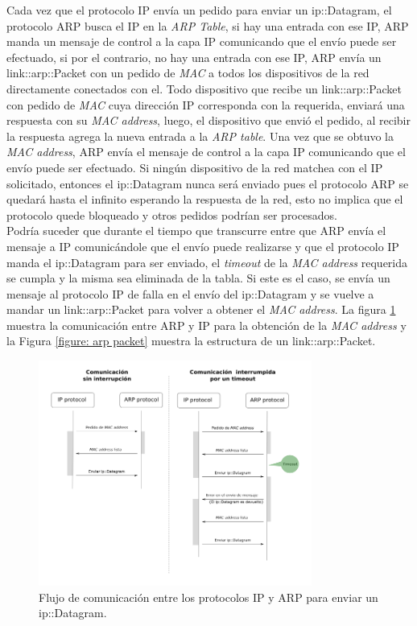 \documentclass[10pt,a4paper]{article}
\begin{document}
Cada vez que el protocolo IP envía un pedido para enviar un ip::Datagram, el protocolo ARP busca el IP en la \textit{ARP Table}, si hay una entrada con ese IP, ARP manda un mensaje de control a la capa IP comunicando que el envío puede ser efectuado, si por el contrario, no hay una entrada con ese IP, ARP envía un link::arp::Packet con un pedido de \textit{MAC} a todos los dispositivos de la red directamente conectados con el. Todo dispositivo que recibe un link::arp::Packet con pedido de \textit{MAC} cuya dirección IP corresponda con la requerida, enviará una respuesta con su \textit{MAC address}, luego, el dispositivo que envió el pedido, al recibir la respuesta agrega la nueva entrada a la \textit{ARP table}. Una vez que se obtuvo la \textit{MAC address}, ARP envía el mensaje de control a la capa IP comunicando que el envío puede ser efectuado. Si ningún dispositivo de la red matchea con el IP solicitado, entonces el ip::Datagram nunca será enviado pues el protocolo ARP se quedará hasta el infinito esperando la respuesta de la red, esto no implica que el protocolo quede bloqueado y otros pedidos podrían ser procesados.\\

Podría suceder que durante el tiempo que transcurre entre que ARP envía el mensaje a IP comunicándole que el envío puede realizarse y que el protocolo IP manda el ip::Datagram para ser enviado, el \textit{timeout} de la \textit{MAC address} requerida se cumpla y la misma sea eliminada de la tabla. Si este es el caso, se envía un mensaje al protocolo IP de falla en el envío del ip::Datagram y se vuelve a mandar un link::arp::Packet para volver a obtener el \textit{MAC address}. La figura \ref{figure: ARP IP comunication flow} muestra la comunicación entre ARP y IP para la obtención de la \textit{MAC address} y la Figura \ref{figure: arp packet} muestra la estructura de un link::arp::Packet.\\

\begin{figure}[!htb]
    \centering
    \includegraphics[width = 0.8\textwidth]{img/png/ip-arp-comunication.png}
    \caption{Flujo de comunicación entre los protocolos IP y ARP para enviar un ip::Datagram.}
    \label{figure: ARP IP comunication flow}
\end{figure}
\end{document}

